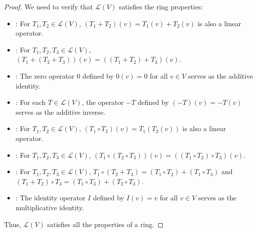 \documentclass[openany]{book}
\begin{document}
\begin{proof}
We need to verify that $\mathcal{L}(V)$ satisfies the ring properties:
\begin{itemize}
    \item {}: For $T_1, T_2 \in \mathcal{L}(V)$, $(T_1 + T_2)(v) = T_1(v) + T_2(v)$ is also a linear operator.
    \item {}: For $T_1, T_2, T_3 \in \mathcal{L}(V)$, $(T_1 + (T_2 + T_3))(v) = ((T_1 + T_2) + T_3)(v)$.
    \item {}: The zero operator $0$ defined by $0(v) = 0$ for all $v \in V$ serves as the additive identity.
    \item {}: For each $T \in \mathcal{L}(V)$, the operator $-T$ defined by $(-T)(v) = -T(v)$ serves as the additive inverse.
    \item {}: For $T_1, T_2 \in \mathcal{L}(V)$, $(T_1 \circ T_2)(v) = T_1(T_2(v))$ is also a linear operator.
    \item {}: For $T_1, T_2, T_3 \in \mathcal{L}(V)$, $(T_1 \circ (T_2 \circ T_3))(v) = ((T_1 \circ T_2) \circ T_3)(v)$.
    \item {}: For $T_1, T_2, T_3 \in \mathcal{L}(V)$, $T_1 \circ (T_2 + T_3) = (T_1 \circ T_2) + (T_1 \circ T_3)$ and $(T_1 + T_2) \circ T_3 = (T_1 \circ T_3) + (T_2 \circ T_3)$.
    \item {}: The identity operator $I$ defined by $I(v) = v$ for all $v \in V$ serves as the multiplicative identity.
\end{itemize}
Thus, $\mathcal{L}(V)$ satisfies all the properties of a ring.
\end{proof}
\end{document}
